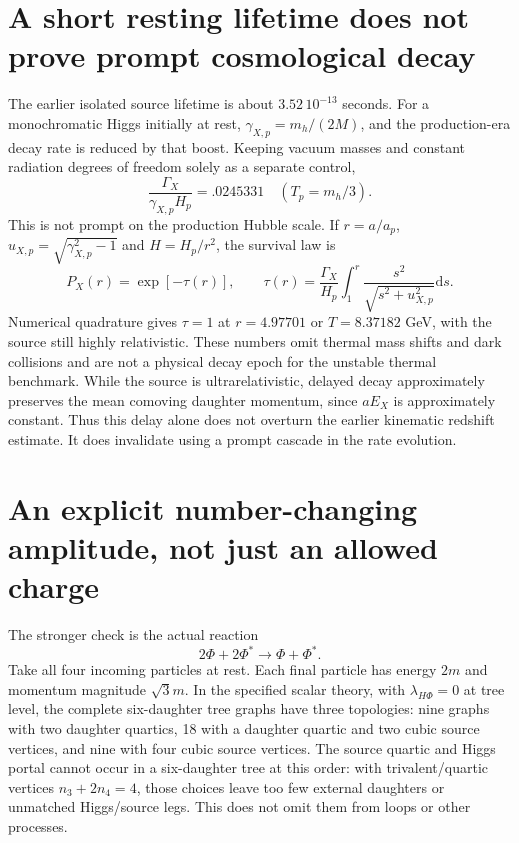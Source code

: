 \documentclass[11pt]{article}
\newcommand{\dd}{\mathrm d}
\begin{document}
\section{A short resting lifetime does not prove prompt cosmological decay}
The earlier isolated source lifetime is about $3.52\,10^{-13}$ seconds.
For a monochromatic Higgs initially at rest, $\gamma_{X,p}=m_h/(2M)$,
and the production-era decay rate is reduced by that boost. Keeping vacuum
masses and constant radiation degrees of freedom solely as a separate control,
\begin{equation}
 \frac{\Gamma_X}{\gamma_{X,p}H_p}=.0245331\quad(T_p=m_h/3).
\end{equation}
This is not prompt on the production Hubble scale. If $r=a/a_p$,
$u_{X,p}=\sqrt{\gamma_{X,p}^2-1}$ and $H=H_p/r^2$, the survival law is
\begin{equation}
 P_X(r)=\exp[-\tau(r)],\qquad
 \tau(r)=\frac{\Gamma_X}{H_p}\int_1^r
 \frac{s^2}{\sqrt{s^2+u_{X,p}^2}}\dd s.
\end{equation}
Numerical quadrature gives $\tau=1$ at $r=4.97701$ or $T=8.37182$ GeV,
with the source still highly relativistic. These numbers omit thermal
mass shifts and dark collisions and are not a physical decay epoch for
the unstable thermal benchmark.
While the source is ultrarelativistic, delayed decay approximately preserves
the mean comoving daughter momentum, since $aE_X$ is approximately constant.
Thus this delay alone does not overturn the earlier kinematic redshift
estimate. It does invalidate using a prompt cascade in the rate evolution.

\section{An explicit number-changing amplitude, not just an allowed charge}
The stronger check is the actual reaction
\begin{equation}
 2\Phi+2\Phi^*\longrightarrow\Phi+\Phi^*.
\end{equation}
Take all four incoming particles at rest. Each final particle has energy
$2m$ and momentum magnitude $\sqrt3m$. In the specified scalar theory,
with $\lambda_{H\Phi}=0$ at tree level, the complete six-daughter tree
graphs have three topologies: nine graphs with two daughter quartics,
18 with a daughter quartic and two cubic source vertices, and nine with
four cubic source vertices. The source quartic and Higgs portal cannot
occur in a six-daughter tree at this order: with trivalent/quartic vertices
$n_3+2n_4=4$, those choices leave too few external daughters or unmatched
Higgs/source legs. This does not omit them from loops or other processes.
\end{document}
